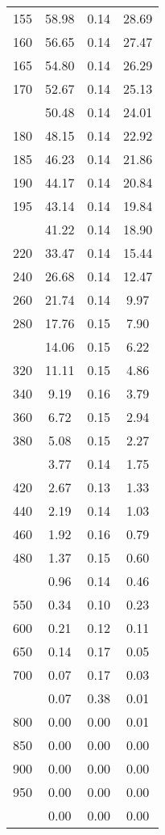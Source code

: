 \begin{table}[ht]
\begin{tabular}{lccc}
  155 & 58.98 & 0.14 & 28.69 \\ 
  160 & 56.65 & 0.14 & 27.47 \\ 
  165 & 54.80 & 0.14 & 26.29 \\ 
  170 & 52.67 & 0.14 & 25.13 \\ 
   \addlinespace
175 & 50.48 & 0.14 & 24.01 \\ 
  180 & 48.15 & 0.14 & 22.92 \\ 
  185 & 46.23 & 0.14 & 21.86 \\ 
  190 & 44.17 & 0.14 & 20.84 \\ 
  195 & 43.14 & 0.14 & 19.84 \\ 
   \addlinespace
200 & 41.22 & 0.14 & 18.90 \\ 
  220 & 33.47 & 0.14 & 15.44 \\ 
  240 & 26.68 & 0.14 & 12.47 \\ 
  260 & 21.74 & 0.14 & 9.97 \\ 
  280 & 17.76 & 0.15 & 7.90 \\ 
   \addlinespace
300 & 14.06 & 0.15 & 6.22 \\ 
  320 & 11.11 & 0.15 & 4.86 \\ 
  340 & 9.19 & 0.16 & 3.79 \\ 
  360 & 6.72 & 0.15 & 2.94 \\ 
  380 & 5.08 & 0.15 & 2.27 \\ 
   \addlinespace
400 & 3.77 & 0.14 & 1.75 \\ 
  420 & 2.67 & 0.13 & 1.33 \\ 
  440 & 2.19 & 0.14 & 1.03 \\ 
  460 & 1.92 & 0.16 & 0.79 \\ 
  480 & 1.37 & 0.15 & 0.60 \\ 
   \addlinespace
500 & 0.96 & 0.14 & 0.46 \\ 
  550 & 0.34 & 0.10 & 0.23 \\ 
  600 & 0.21 & 0.12 & 0.11 \\ 
  650 & 0.14 & 0.17 & 0.05 \\ 
  700 & 0.07 & 0.17 & 0.03 \\ 
   \addlinespace
750 & 0.07 & 0.38 & 0.01 \\ 
  800 & 0.00 & 0.00 & 0.01 \\ 
  850 & 0.00 & 0.00 & 0.00 \\ 
  900 & 0.00 & 0.00 & 0.00 \\ 
  950 & 0.00 & 0.00 & 0.00 \\ 
   \addlinespace
1000 & 0.00 & 0.00 & 0.00 \\ 
   \bottomrule
\end{tabular}
\end{table}
